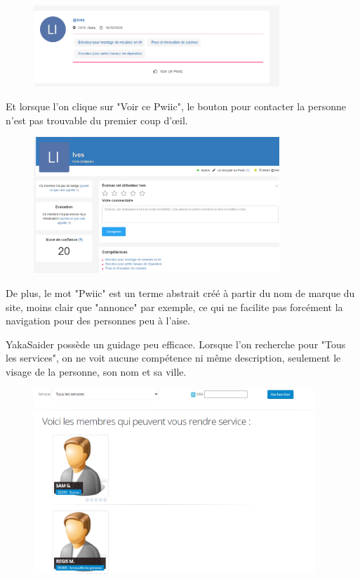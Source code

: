 \documentclass[a4paper,11pt]{article}
\begin{document}
\begin{figure}[H]
  \includegraphics[width=350px]{images/guidage-pwiic.png}
  \label{fig:guidage-pwiic}
\end{figure}

Et lorsque l’on clique sur "Voir ce Pwiic", le bouton pour contacter la personne n’est pas trouvable du premier coup d’œil.\\

\begin{figure}[H]
  \includegraphics[width=350px]{images/voir-ce-pwiic.png}
  \label{fig:voir-ce-pwiic}
\end{figure}

De plus, le mot "Pwiic" est un terme abstrait créé à partir du nom de marque du site, moins clair que "annonce"
par exemple, ce qui ne facilite pas forcément la navigation pour des personnes peu à l’aise.

YakaSaider possède un guidage peu efficace. Lorsque l’on recherche pour "Tous les services", on ne voit aucune
compétence ni même description, seulement le visage de la personne, son nom et sa ville.\\

\begin{figure}[H]
  \includegraphics[width=400px]{images/guidage-yakasaider.png}
  \label{fig:guidage-yakasaider}
\end{figure}
\end{document}

